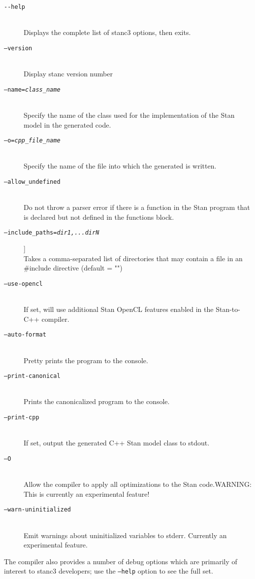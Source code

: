 \begin{description}
%
\item[\tt {-}-help] 
\mbox{ } \\ 
Displays the complete list of stanc3 options, then exits.
%
\item[\tt  --version]
\mbox{ } \\ 
 Display stanc version number
%
\item[\tt  --name={\slshape class\_name}]
\mbox{ } \\ 
Specify the name of the class used for the implementation of the
Stan model in the generated \Cpp code.  
%
\item[\tt --o={\slshape cpp\_file\_name}]
\mbox{} \\
Specify the name of the file into which the generated \Cpp is written.
%
\item[\tt  --allow\_undefined]
\mbox{ } \\ 
Do not throw a parser error if there is a function in the Stan program
that is declared but not defined in the functions block.
%
\item[\tt  --include\_paths={\slshape dir1,...dirN}]]
\mbox{ } \\ 
Takes a comma-separated list of directories that may contain a file in an \#include directive (default = "")
%
\item[\tt  --use-opencl]
\mbox{ } \\ 
If set, will use additional Stan OpenCL features enabled in the Stan-to-C++ compiler.
%
\item[\tt --auto-format]
\mbox{ } \\ 
 Pretty prints the program to the console.
%
\item[\tt  --print-canonical]
\mbox{ } \\ 
 Prints the canonicalized program to the console.
%
\item[\tt  --print-cpp]
\mbox{ } \\ 
If set, output the generated C++ Stan model class to stdout.
%
\item[\tt  --O ]
\mbox{ } \\ 
Allow the compiler to apply all optimizations to the Stan code.WARNING: This is currently an experimental feature!
%
\item[\tt  --warn-uninitialized]
\mbox{ } \\ 
Emit warnings about uninitialized variables to stderr. Currently an experimental feature.
\end{description}
%
The compiler also provides a number of debug options which are
primarily of interest to stanc3 developers; use the {\tt --help}  option
to see the full set.

